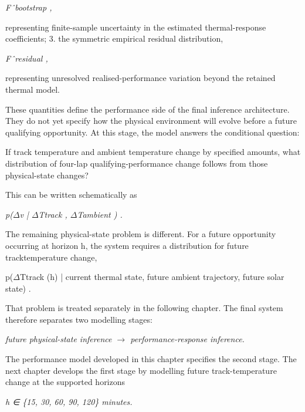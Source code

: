 \begin{center}\textit{Fˆbootstrap ,}\end{center}

representing finite-sample uncertainty in the estimated thermal-response coefficients; 3. the symmetric empirical residual distribution,

\begin{center}\textit{Fˆresidual ,}\end{center}

representing unresolved realised-performance variation beyond the retained thermal model.

These quantities define the performance side of the final inference architecture. They do not yet specify how the physical environment will evolve before a future qualifying opportunity. At this stage, the model answers the conditional question:

If track temperature and ambient temperature change by specified amounts, what distribution of four-lap qualifying-performance change follows from those physical-state changes?

This can be written schematically as

\begin{center}\textit{p(\ensuremath{\Delta}v | \ensuremath{\Delta}Ttrack , \ensuremath{\Delta}Tambient ) .}\end{center}

The remaining physical-state problem is different. For a future opportunity occurring at horizon h, the system requires a distribution for future tracktemperature change,

p(\ensuremath{\Delta}Ttrack (h) | current thermal state, future ambient trajectory, future solar state) .

That problem is treated separately in the following chapter. The final system therefore separates two modelling stages:

\begin{center}\textit{future physical-state inference \ensuremath{\rightarrow} performance-response inference.}\end{center}

The performance model developed in this chapter specifies the second stage. The next chapter develops the first stage by modelling future track-temperature change at the supported horizons

\begin{center}\textit{h ∈ \{15, 30, 60, 90, 120\} minutes.}\end{center}

